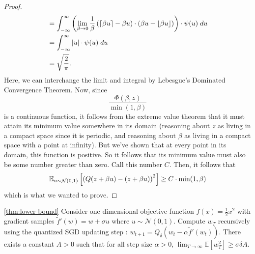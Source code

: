 \begin{proof}
\begin{align*}
    &=
    \int_{-\infty}^{\infty}
    \left(
      \lim_{\beta \rightarrow 0}
      \frac{1}{\beta} 
      \left( \lceil \beta u \rceil - \beta u \right) \cdot \left( \beta u - \lfloor \beta u \rfloor \right)
    \right)
    \cdot \psi(u) \; du \\
    &=
    \int_{-\infty}^{\infty}
    \left| u \right|
    \cdot \psi(u) \; du \\
    &=
    \sqrt{\frac{2}{\pi}}.
  \end{align*}
  Here, we can interchange the limit and integral by Lebesgue's Dominated Convergence Theorem.
  Now, since
  \[
    \frac{\Phi(\beta, z)}{\min(1, \beta)}
  \]
  is a continuous function, it follows from the extreme value theorem that it must attain its minimum value somewhere in its domain (reasoning about $z$ as living in a compact space since it is periodic, and reasoning about $\beta$ as living in a compact space with a point at infinity).
  But we've shown that at every point in its domain, this function is positive.
  So it follows that its minimum value must also be some number greater than zero.
  Call this number $C$.
  Then, it follows that
  \[
    \mathbb{E}_{u \sim \mathcal{N}(0,1)}\left[  \left( Q(z + \beta u) - (z + \beta u) \right)^2  \right]
    \ge
    C \cdot \min(1, \beta)
  \]
  which is what we wanted to prove.
\end{proof}

\begin{customthm}{\ref{thm:lower-bound}}\label{thm:lower-bound-appendix}
Consider one-dimensional objective function $f(x) = \frac{1}{2}x^2$ with gradient samples $\tilde{f}'(w) = w + \sigma u$ where $u \sim \mathcal{N}(0,1)$. Compute $w_T$ recursively using the quantized SGD updating step : $w_{t+1} = Q_\delta(w_t - \alpha \tilde{f}'(w_t))$. There exists a constant $A > 0$ such that for all step size $\alpha > 0$, 
$\lim_{T\to \infty} \mathbb{E}[w_T^2] \geq \sigma \delta A$.
\end{customthm}

